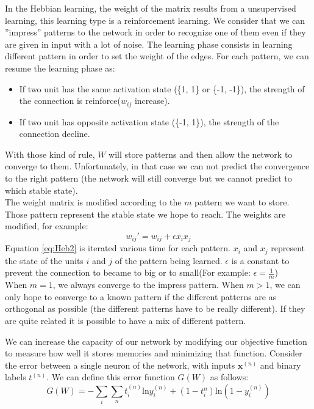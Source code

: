  In the Hebbian learning, the weight of the matrix results from a unsupervised learning, this learning type is a reinforcement learning. We consider that we can ”impress” patterns to the network in order to recognize one of them even if they are given in input with a lot of noise. The learning phase consists in learning different pattern in order to set the weight of the edges. For each pattern, we can resume the learning phase as:
  \begin{itemize}
    \item If two unit has the same activation state (\{1, 1\} or \{-1, -1\}), the strength of the connection is reinforce($w_{ij}$ increase).
    \item If two unit has opposite activation state (\{-1, 1\}), the strength of the connection decline.
  \end{itemize}
  With those kind of rule, $W$ will store patterns and then allow the network to converge to them. Unfortunately, in that case we can not predict the convergence to the right pattern (the network will still converge but we cannot predict to which stable state). \\

  The weight matrix is modified according to the $m$ pattern we want to store. Those pattern represent the stable state we hope to reach. The weights are modified, for example:
  \begin{equation}
  \label{eq:Heb2}
  w_{ij}' = w_{ij} + \epsilon x_i x_j
  \end{equation}
  Equation \ref{eq:Heb2} is iterated various time for each pattern. $x_i$ and $x_j$ represent the state of the units $i$ and $j$ of the pattern being learned. $\epsilon$ is a constant to prevent the connection to became to big or to small(For example: $\epsilon = \frac{1}{m}$)\\

  When $m = 1$, we always converge to the impress pattern. When $m > 1$, we can only hope to converge to a known pattern if the different patterns are as orthogonal as possible (the different patterns have to be really different). If they are quite related it is possible to have a mix of different pattern.

  We can increase the capacity of our network by modifying our objective function to measure how well it stores memories and minimizing that function. Consider the error between a single neuron of the network, with inputs $\textbf{x}^{(n)}$ and binary labels $t^{(n)}$. We can define this error function $G(W)$ as follows:
\begin{equation}
\label{eq:opt1}
G(W) = -\sum_{i} \sum_{n} t_{i}^{(n)}\text{ln}y_{i}^{(n)} + (1 - t_{i}^{n})\text{ln}(1 - y_{i}^{(n)})
\end{equation}


